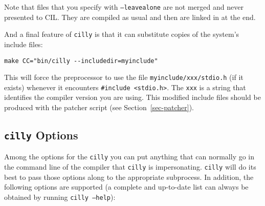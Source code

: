 \documentclass{article}
\def\secref#1{Section~\ref{sec-#1}}
\def\t#1{{\tt #1}}
\begin{document}
 Note that files that you specify with \t{--leavealone} are not merged and
never presented to CIL. They are compiled as usual and then are linked in at
the end. 

 And a final feature of \t{cilly} is that it can substitute copies of the
system's include files:

\begin{verbatim}
make CC="bin/cilly --includedir=myinclude"
\end{verbatim}

 This will force the preprocessor to use the file \t{myinclude/xxx/stdio.h}
(if it exists) whenever it encounters \t{#include <stdio.h>}. The \t{xxx} is
a string that identifies the compiler version you are using. This modified
include files should be produced with the patcher script (see
\secref{patcher}).

  \subsection{\t{cilly} Options}

 Among the options for the \t{cilly} you can put anything that can normally
go in the command line of the compiler that \t{cilly} is impersonating.
\t{cilly} will do its best to pass those options along to the appropriate
subprocess. In addition, the following options are supported (a complete and
up-to-date list can always be obtained by running \t{cilly --help}):
\end{document}
